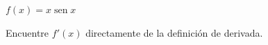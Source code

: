 \item $f(x) = x \operatorname{sen} x$
\par
Encuentre $f'(x)$ directamente de la definición de derivada.
